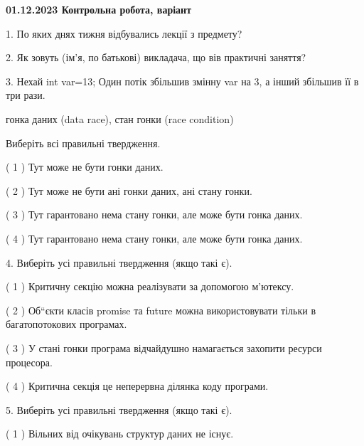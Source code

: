 \documentclass[12pt, ukrainian]{article}
\begin{document}
\vspace{4mm}
\newpage
\begin {large}

\textbf{01.12.2023 Контрольна робота, варіант  }\par


{
1. По яких днях тижня відбувались лекції з предмету?



\vspace{5mm}
2. Як зовуть (ім'я, по батькові) викладача, що вів практичні заняття?



\vspace{5mm}
3. Нехай int var=13; Один потік збільшив змінну var на 3, а інший збільшив її в три рази.

гонка даних (data race), стан гонки (race condition)

Виберіть всі правильні твердження.\par
\vspace{2mm}
( 1 ) Тут може не бути гонки даних.%

( 2 ) Тут може не бути ані гонки даних, ані стану гонки.%

( 3 ) Тут гарантовано нема стану гонки, але може бути гонка даних.%

( 4 ) Тут гарантовано нема стану гонки, але може бути гонка даних.%


\vspace{5mm}
4. Виберіть усі правильні твердження (якщо такі є).\par
\vspace{2mm}

( 1 ) Критичну секцію можна реалізувати за допомогою м’ютексу.%

( 2 ) Об“єкти класів promise та future можна використовувати тільки в багатопотокових програмах.%

( 3 ) У стані гонки програма відчайдушно намагається захопити ресурси процесора.%

( 4 ) Критична секція це неперервна ділянка коду програми.%


\vspace{5mm}
5. Виберіть усі правильні твердження (якщо такі є).\par
\vspace{2mm}

( 1 ) Вільних від очікувань структур даних не існує.%

}
\end{large}
\end{document}
